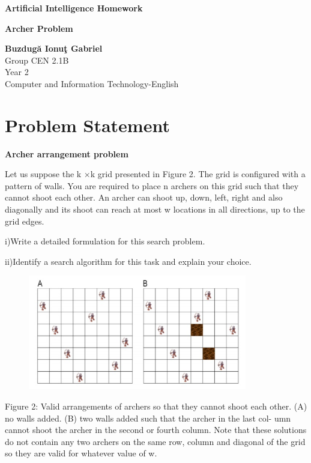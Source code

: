 \documentclass{article}
\begin{document}
\graphicspath{ {./images/} } 
\begin{titlepage}
 
   \begin{center}
   
       \vspace*{1cm}
       \Huge
       \textbf{Artificial Intelligence Homework} \vspace{1 cm}
       
       \textbf{Archer Problem}
            
       \vspace{1 cm}
      \LARGE
       \textbf{Buzdug\u{a} Ionu\c{t} Gabriel}\\
       Group CEN 2.1B\\
       Year 2\\
       Computer and Information Technology-English
       \vfill
            
      
            
       \vspace{0.8cm}
      
    
    \end{center}
  \end{titlepage}
\newpage

\section {\Large Problem Statement} \vspace*{1cm}
\Large \textbf{Archer arrangement problem} \vspace*{1cm}
\par Let us suppose the k ×k grid presented in Figure 2. The grid is configured with
a pattern of walls. You are required to place n archers on this grid such that
they cannot shoot each other. An archer can shoot up, down, left, right and
also diagonally and its shoot can reach at most w locations in all directions, up
to the grid edges.
\par i)Write a detailed formulation for this search problem.
\par ii)Identify a search algorithm for this task and explain your choice.
\begin{figure}[h]
\includegraphics[width=12 cm, height=5cm]{figure2}
\end{figure}
\par Figure 2: Valid arrangements of archers so that they cannot shoot each other.
(A) no walls added. (B) two walls added such that the archer in the last col-
umn cannot shoot the archer in the second or fourth column. Note that these
solutions do not contain any two archers on the same row, column and diagonal
of the grid so they are valid for whatever value of w.
\newpage
\end{document}
